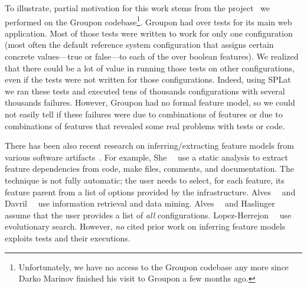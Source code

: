 To illustrate, partial motivation for
this work stems from the project~\cite{kim-etal-fse2013} we performed
on the Groupon codebase\footnote{Unfortunately, we have no access to
the Groupon codebase any more since Darko Marinov finished his visit
to Groupon a few months ago.}.  Groupon had over \GrouponTestsNum{}
tests for its main web application.  Most of those tests were written
to work for only one configuration (most often the default reference
system configuration that assigns certain concrete values---true or
false---to each of the over \GrouponFeaturesNum{} boolean features).
We realized that there could be a lot of value in running those tests
on other configurations, even if the tests were not written for those
configurations.  Indeed, using SPLat~\cite{kim-etal-fse2013} we ran
these tests and executed tens of thousands configurations
with several thousands failures.  However, Groupon had no formal feature model,
so we could not easily tell if these failures were due to \inconsistent{}
combinations of features or due to \consistent{} combinations of features that
revealed some real problems with tests or code.  

There has been also recent research on inferring/extracting feature models
from various software artifacts~\cite{she-etal-icse2011,
alves-splc-2008, davril-etal-fse2013, haslinger-etal-fase2013,
andersen-etal-splc2012, lopes-herrejon-etal-ssbse2012, acher-vamos2012,
weston-splc2009, czarnecki-wasowski-splc2007}.  For example,
She~\etal{}~\cite{she-etal-icse2011} use a static analysis to extract
feature dependencies from code, make files, comments, and
documentation.  The technique is not fully automatic; the user needs
to select, for each feature, its feature parent from a list of options
provided by the infrastructure.  Alves~\etal{}~\cite{alves-splc-2008}
and Davril~\etal{}~\cite{davril-etal-fse2013} use information
retrieval and data mining.  Alves~\etal{}~\cite{alves-splc-2008} and
Haslinger~\etal{}~\cite{haslinger-etal-fase2013} assume that the user
provides a list of \emph{all} \consistent{} configurations.
Lopez-Herrejon~\etal{}~\cite{lopes-herrejon-etal-ssbse2012} use
evolutionary search.
However, \emph{no} cited prior work on inferring feature models
exploits tests and their executions.

